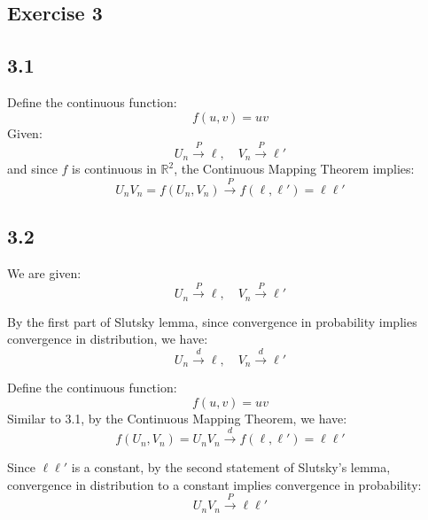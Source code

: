 \documentclass[12pt]{article}
\begin{document}
\begin{flushleft}
\section*{Exercise 3}

\subsection*{3.1}
Define the continuous function:
\[
f(u,v) = uv
\]
Given:
\[
U_n \xrightarrow{P} \ell, \quad V_n \xrightarrow{P} \ell'
\]
and since \(f\) is continuous in \(\mathbb{R}^2\), the Continuous Mapping Theorem implies:
\[
U_n V_n = f(U_n, V_n) \xrightarrow{P} f(\ell, \ell') = \ell \ell'
\]

\subsection*{3.2}
We are given:
\[
U_n \xrightarrow{P} \ell, \quad V_n \xrightarrow{P} \ell'
\]

By the first part of Slutsky lemma, since convergence in probability implies convergence in distribution, we have:
\[
U_n \xrightarrow{d} \ell, \quad V_n \xrightarrow{d} \ell'
\]



Define the continuous function:
\[
f(u, v) = uv
\]
Similar to 3.1, by the Continuous Mapping Theorem, we have:
\[
f(U_n, V_n) = U_n V_n \xrightarrow{d} f(\ell, \ell') = \ell \ell'
\]


Since \(\ell \ell'\) is a constant, by the second statement of Slutsky's lemma, convergence in distribution to a constant implies convergence in probability:
\[
U_n V_n \xrightarrow{P} \ell \ell'
\]




\end{flushleft}
\end{document}
